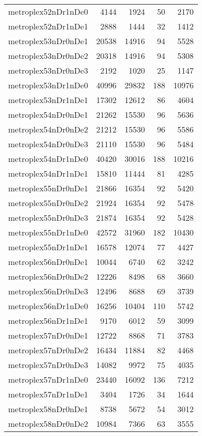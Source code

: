 \begin{tabular}{lrrrr}
metroplex52nDr1nDe0 & 4144 & 1924 & 50 & 2170 \\
metroplex52nDr1nDe1 & 2888 & 1444 & 32 & 1412 \\
metroplex53nDr0nDe1 & 20538 & 14916 & 94 & 5528 \\
metroplex53nDr0nDe2 & 20318 & 14916 & 94 & 5308 \\
metroplex53nDr0nDe3 & 2192 & 1020 & 25 & 1147 \\
metroplex53nDr1nDe0 & 40996 & 29832 & 188 & 10976 \\
metroplex53nDr1nDe1 & 17302 & 12612 & 86 & 4604 \\
metroplex54nDr0nDe1 & 21262 & 15530 & 96 & 5636 \\
metroplex54nDr0nDe2 & 21212 & 15530 & 96 & 5586 \\
metroplex54nDr0nDe3 & 21110 & 15530 & 96 & 5484 \\
metroplex54nDr1nDe0 & 40420 & 30016 & 188 & 10216 \\
metroplex54nDr1nDe1 & 15810 & 11444 & 81 & 4285 \\
metroplex55nDr0nDe1 & 21866 & 16354 & 92 & 5420 \\
metroplex55nDr0nDe2 & 21924 & 16354 & 92 & 5478 \\
metroplex55nDr0nDe3 & 21874 & 16354 & 92 & 5428 \\
metroplex55nDr1nDe0 & 42572 & 31960 & 182 & 10430 \\
metroplex55nDr1nDe1 & 16578 & 12074 & 77 & 4427 \\
metroplex56nDr0nDe1 & 10044 & 6740 & 62 & 3242 \\
metroplex56nDr0nDe2 & 12226 & 8498 & 68 & 3660 \\
metroplex56nDr0nDe3 & 12496 & 8688 & 69 & 3739 \\
metroplex56nDr1nDe0 & 16256 & 10404 & 110 & 5742 \\
metroplex56nDr1nDe1 & 9170 & 6012 & 59 & 3099 \\
metroplex57nDr0nDe1 & 12722 & 8868 & 71 & 3783 \\
metroplex57nDr0nDe2 & 16434 & 11884 & 82 & 4468 \\
metroplex57nDr0nDe3 & 14082 & 9972 & 75 & 4035 \\
metroplex57nDr1nDe0 & 23440 & 16092 & 136 & 7212 \\
metroplex57nDr1nDe1 & 3404 & 1726 & 34 & 1644 \\
metroplex58nDr0nDe1 & 8738 & 5672 & 54 & 3012 \\
metroplex58nDr0nDe2 & 10984 & 7366 & 63 & 3555 \\

\end{tabular}
